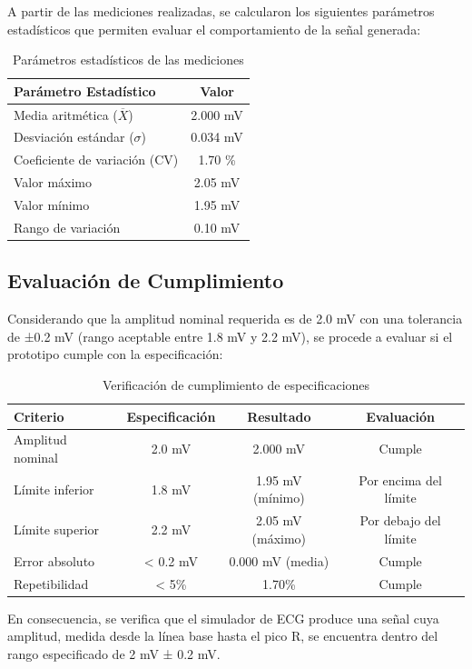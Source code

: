 \documentclass[a4paper,openany,12pt]{book}
\begin{document}
A partir de las mediciones realizadas, se calcularon los siguientes parámetros estadísticos que permiten evaluar el comportamiento de la señal generada:

\begin{table}[h]
	\centering
	\begin{tabular}{|l|c|}
		\hline
		\textbf{Parámetro Estadístico} & \textbf{Valor} \\
		\hline
		Media aritmética (\( \overline{X} \)) & 2.000 mV \\
		\hline
		Desviación estándar (\( \sigma \)) & 0.034 mV \\
		\hline
		Coeficiente de variación (CV) & 1.70 \% \\
		\hline
		Valor máximo & 2.05 mV \\
		\hline
		Valor mínimo & 1.95 mV \\
		\hline
		Rango de variación & 0.10 mV \\
		\hline
	\end{tabular}
	\caption{Parámetros estadísticos de las mediciones}
	\label{tab:estadistica}
\end{table}

\subsection{Evaluación de Cumplimiento}

Considerando que la amplitud nominal requerida es de 2.0 mV con una tolerancia de ±0.2 mV (rango aceptable entre 1.8 mV y 2.2 mV), se procede a evaluar si el prototipo cumple con la especificación:

\begin{table}[h]
	\centering
	\begin{tabular}{|l|c|c|c|}
		\hline
		\textbf{Criterio} & \textbf{Especificación} & \textbf{Resultado} & \textbf{Evaluación} \\
		\hline
		Amplitud nominal & 2.0 mV & 2.000 mV & Cumple \\
		\hline
		Límite inferior & 1.8 mV & 1.95 mV (mínimo) & Por encima del límite \\
		\hline
		Límite superior & 2.2 mV & 2.05 mV (máximo) & Por debajo del límite \\
		\hline
		Error absoluto & < 0.2 mV & 0.000 mV (media) & Cumple \\
		\hline
		Repetibilidad & < 5\% & 1.70\% & Cumple \\
		\hline
	\end{tabular}
	\caption{Verificación de cumplimiento de especificaciones}
	\label{tab:cumplimiento}
\end{table}
En consecuencia, se verifica que el simulador de ECG produce una señal cuya amplitud, medida desde la línea base hasta el pico R, se encuentra dentro del rango especificado de 2 mV ± 0.2 mV.
\end{document}
